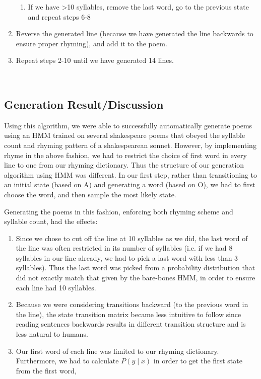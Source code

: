 \begin{enumerate}
\begin{enumerate}
\item If we have \textgreater 10 syllables, remove the last word, go to the previous state and repeat steps 6-8

\end{enumerate}

\item Reverse the generated line (because we have generated the line backwards to ensure proper rhyming), and add it to the poem.

\item Repeat steps 2-10 until we have generated 14 lines.

\end{enumerate}

~

\subsection*{Generation Result/Discussion}

Using this algorithm, we were able to successfully automatically generate poems using an HMM trained on several shakespeare poems that obeyed the syllable count and rhyming pattern of a shakespearean sonnet. However, by implementing rhyme in the above fashion, we had to restrict the choice of first word in every line to one from our rhyming dictionary. Thus the structure of our generation algorithm using HMM was different. In our first step, rather than transitioning to an initial state (based on A) and generating a word (based on O), we had to first choose the word, and then sample the most likely state.

Generating the poems in this fashion, enforcing both rhyming scheme and syllable count, had the effects:

\begin{enumerate}

\item Since we chose to cut off the line at 10 syllables as we did, the last word of the line was often restricted in its number of syllables (i.e. if we had 8 syllables in our line already, we had to pick a last word with less than 3 syllables). Thus the last word was picked from a probability distribution that did not exactly match that given by the bare-bones HMM, in order to ensure each line had 10 syllables.

\item Because we were considering transitions backward (to the previous word in the line), the state transition matrix became less intuitive to follow since reading sentences backwards results in different transition structure and is less natural to humans.

\item Our first word of each line was limited to our rhyming dictionary. Furthermore, we had to calculate $P(y \mid x)$ in order to get the first state from the first word, 

\end{enumerate}

